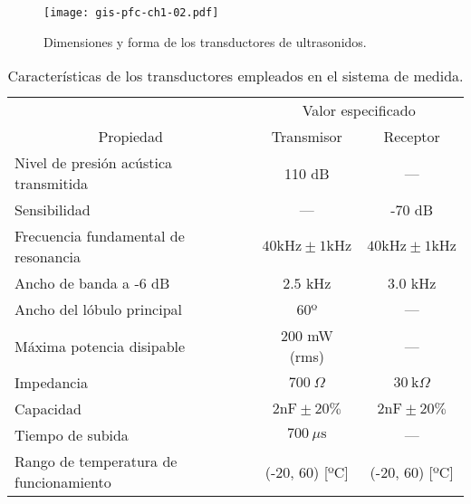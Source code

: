 \begin{figure}
    \begin{center}
	\texttt{[image: gis-pfc-ch1-02.pdf]}
    \end{center}
    \caption[Dimensiones de los transductores de
    ultrasonidos]{Dimensiones y forma de los transductores de
    ultrasonidos.}
    \label{fig:transducers}
\end{figure}

\begin{sidewaystable}
    \centering
    \begin{threeparttable}
	\begin{tabular}{l c c}
	    \toprule
	    & \multicolumn{2}{c}{Valor especificado\tnote{*}} \\
	    \cmidrule(l){2-3}
	    \multicolumn{1}{c}{Propiedad} & Transmisor & Receptor \\
	    \midrule
	    Nivel de presión acústica transmitida & 110 dB & --- \\
	    Sensibilidad & --- & -70 dB \\
	    Frecuencia fundamental de resonancia
	    & $40 \text{kHz} \pm 1 \text{kHz}$
	    & $40 \text{kHz} \pm 1 \text{kHz}$ \\
	    Ancho de banda a -6 dB & $2.5$ kHz & $3.0$ kHz \\
	    Ancho del lóbulo principal & 60º & --- \\
	    Máxima potencia disipable & 200 mW (rms) & --- \\
	    Impedancia & $700\ \Omega$ & $30\ \text{k}\Omega$ \\
	    Capacidad & $2 \text{nF} \pm 20\%$
	    & $2 \text{nF} \pm 20\%$ \\
	    Tiempo de subida & $700\ \mu\text{s}$ & --- \\
	    Rango de temperatura de funcionamiento %
	    & (-20, 60) [ºC] & (-20, 60) [ºC] \\
	    \bottomrule
	\end{tabular}
	\begin{TableNotes}
	\end{TableNotes}
    \end{threeparttable}
    \caption[Características de los transductores]{Características de
    los transductores empleados en el sistema de medida.}
    \label{tab:transducers}
\end{sidewaystable}


